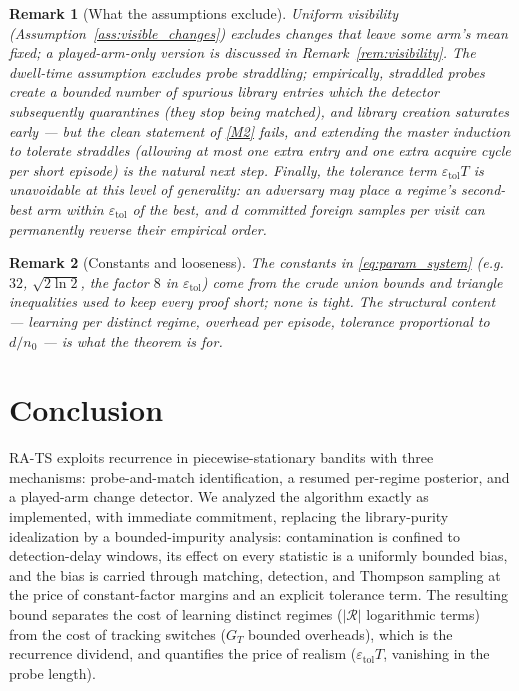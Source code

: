 \documentclass[11pt]{article}
\newtheorem{remark}{Remark}
\newcommand{\Rcal}{\mathcal R}
\newcommand{\etol}{\varepsilon_{\mathrm{tol}}}
\begin{document}
\begin{remark}[What the assumptions exclude]
Uniform visibility (Assumption~\ref{ass:visible_changes}) excludes changes that leave some arm's mean fixed; a played-arm-only version is discussed in Remark~\ref{rem:visibility}. The dwell-time assumption excludes probe straddling; empirically, straddled probes create a bounded number of spurious library entries which the detector subsequently quarantines (they stop being matched), and library creation saturates early --- but the clean statement of \ref{M2} fails, and extending the master induction to tolerate straddles (allowing at most one extra entry and one extra acquire cycle per short episode) is the natural next step. Finally, the tolerance term $\etol T$ is unavoidable at this level of generality: an adversary may place a regime's second-best arm within $\etol$ of the best, and $d$ committed foreign samples per visit can permanently reverse their empirical order.
\end{remark}

\begin{remark}[Constants and looseness]
The constants in \eqref{eq:param_system} (e.g.\ $32$, $\sqrt{2\ln2}$, the factor $8$ in $\etol$) come from the crude union bounds and triangle inequalities used to keep every proof short; none is tight. The structural content --- learning per distinct regime, overhead per episode, tolerance proportional to $d/n_0$ --- is what the theorem is for.
\end{remark}

\section{Conclusion}

RA-TS exploits recurrence in piecewise-stationary bandits with three mechanisms: probe-and-match identification, a resumed per-regime posterior, and a played-arm change detector. We analyzed the algorithm exactly as implemented, with immediate commitment, replacing the library-purity idealization by a bounded-impurity analysis: contamination is confined to detection-delay windows, its effect on every statistic is a uniformly bounded bias, and the bias is carried through matching, detection, and Thompson sampling at the price of constant-factor margins and an explicit tolerance term. The resulting bound separates the cost of learning distinct regimes ($|\Rcal|$ logarithmic terms) from the cost of tracking switches ($G_T$ bounded overheads), which is the recurrence dividend, and quantifies the price of realism ($\etol T$, vanishing in the probe length).
\end{document}
